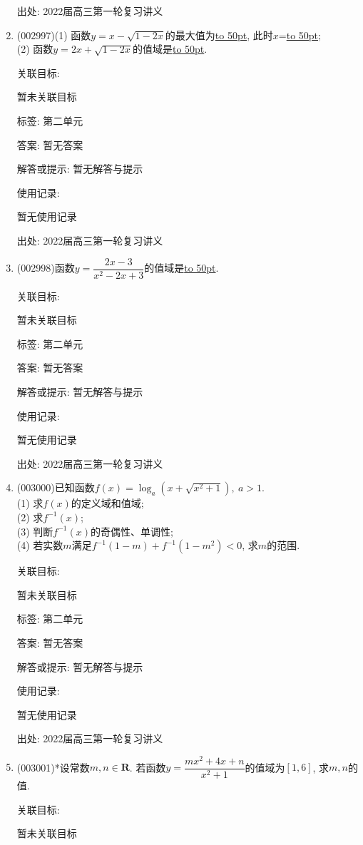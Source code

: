 \documentclass[10pt,a4paper]{article}
\newcommand{\blank}[1]{\underline{\hbox to #1pt{}}}
\begin{document}
\begin{enumerate}[1.]
出处: 2022届高三第一轮复习讲义
\item { (002997)}(1) 函数$y=x-\sqrt{1-2x}$的最大值为\blank{50}, 此时$x$=\blank{50};\\
(2) 函数$y=2x+\sqrt{1-2x}$的值域是\blank{50}.


关联目标:

暂未关联目标



标签: 第二单元

答案: 暂无答案

解答或提示: 暂无解答与提示

使用记录:

暂无使用记录


出处: 2022届高三第一轮复习讲义
\item { (002998)}函数$y=\dfrac{2x-3}{x^2-2x+3}$的值域是\blank{50}.


关联目标:

暂未关联目标



标签: 第二单元

答案: 暂无答案

解答或提示: 暂无解答与提示

使用记录:

暂无使用记录


出处: 2022届高三第一轮复习讲义
\item { (003000)}已知函数$f(x)=\log_a(x+\sqrt{x^2+1}), \ a>1$.\\
(1) 求$f(x)$的定义域和值域;\\
(2) 求$f^{-1}(x)$;\\
(3) 判断$f^{-1}(x)$的奇偶性、单调性;\\
(4) 若实数$m$满足$f^{-1}(1-m)+f^{-1}(1-m^2)<0$, 求$m$的范围.


关联目标:

暂未关联目标



标签: 第二单元

答案: 暂无答案

解答或提示: 暂无解答与提示

使用记录:

暂无使用记录


出处: 2022届高三第一轮复习讲义
\item { (003001)}*设常数$m,n\in \mathbf{R}$. 若函数$y=\dfrac{mx^2+4x+n}{x^2+1}$的值域为$[1,6]$, 求$m,n$的值.


关联目标:

暂未关联目标




\end{enumerate}
\end{document}
